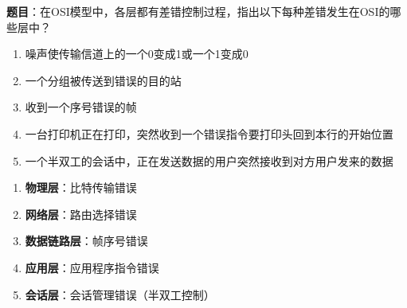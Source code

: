 \begin{examplebox}
\textbf{题目}：在OSI模型中，各层都有差错控制过程，指出以下每种差错发生在OSI的哪些层中？
\begin{enumerate}[itemsep=0pt]
    \item 噪声使传输信道上的一个0变成1或一个1变成0
    \item 一个分组被传送到错误的目的站
    \item 收到一个序号错误的帧
    \item 一台打印机正在打印，突然收到一个错误指令要打印头回到本行的开始位置
    \item 一个半双工的会话中，正在发送数据的用户突然接收到对方用户发来的数据
\end{enumerate}
\tcblower
\begin{enumerate}[itemsep=0pt]
    \item \textbf{物理层}：比特传输错误
    \item \textbf{网络层}：路由选择错误
    \item \textbf{数据链路层}：帧序号错误
    \item \textbf{应用层}：应用程序指令错误
    \item \textbf{会话层}：会话管理错误（半双工控制）
\end{enumerate}
\end{examplebox}

